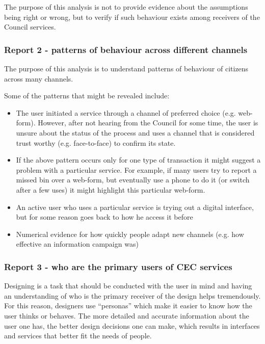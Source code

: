 The purpose of this analysis is not to provide evidence about the assumptions being right or wrong, but to verify if such behaviour exists among receivers of the Council services.
			
			\subsubsection{Report 2 - patterns of behaviour across different channels}
			
The purpose of this analysis is to understand patterns of behaviour of citizens across many channels.

Some of the patterns that might be revealed include:
\begin{itemize}
\item The user initiated a service through a channel of preferred choice (e.g. web-form). However, after not hearing from the Council for some time, the user is unsure about the status of the process and uses a channel that is considered trust worthy (e.g. face-to-face) to confirm its state.
\item If the above pattern occurs only for one type of transaction it might suggest a problem with a particular service. For example, if many users try to report a missed bin over a web-form, but eventually use a phone to do it (or switch after a few uses) it might highlight this particular web-form.
\item An active user who uses a particular service is trying out a digital interface, but for some reason goes back to how he access it before
\item Numerical evidence for how quickly people adapt new channels (e.g. how effective an information campaign was)
\end{itemize}	
			
			\subsubsection{Report 3 - who are the primary users of CEC services}
			
Designing is a task that should be conducted with the user in mind and having an understanding of who is the primary receiver of the design helps tremendously. For this reason, designers use “personas” which make it easier to know how the user thinks or behaves. The more detailed and accurate information about the user one has, the  better design decisions one can make, which results in interfaces and services that better fit the needs of people.

